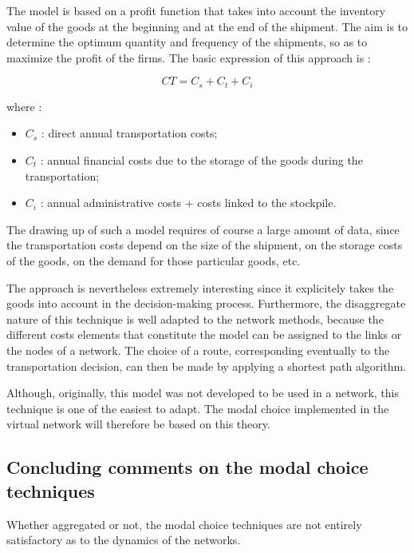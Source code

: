 The model is based on a profit function that takes into account the inventory
value of the goods at the beginning and at the end of the shipment. The aim is
to determine the optimum quantity and frequency of the shipments, so as to
maximize the profit of the firms.  The basic expression of this approach is
:

$$CT = C_s + C_t + C_i$$

where :

\begin{itemize}
\item $C_s$ : direct annual transportation costs;
\item $C_t$ : annual financial costs due to the storage of the goods during the
transportation;
\item $C_i$ : annual administrative costs + costs linked to the stockpile.
\end{itemize}




The drawing up of such a model requires of course a large amount of data, since
the transportation costs depend on the size of the shipment, on the storage costs of
the goods, on the demand for those particular goods, etc.

The approach is nevertheless extremely interesting since it explicitely takes
the goods into account in the decision-making process.  Furthermore, the
disaggregate nature of this technique is well adapted to the network methods,
because the different costs elements that constitute the model can be assigned
to the links or the nodes of a network. The choice of a route, corresponding
eventually to the transportation decision, can then be made by applying a shortest path 
algorithm.



Although, originally, this model was not developed to be used in a network, this
technique is one of the easiest to adapt.  The modal choice implemented in the virtual network will therefore be based on this theory.





\subsection{Concluding comments on the modal choice techniques }


Whether aggregated or not, the modal choice techniques are not entirely
satisfactory as to the dynamics of the networks.

